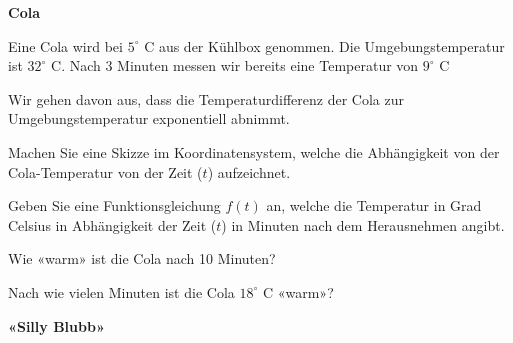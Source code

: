 

\bbwActAufgabenNr{} \textbf{Cola}

Eine Cola wird bei $5^\circ \textrm{ C}$ aus der Kühlbox genommen. Die
Umgebungstemperatur ist $32^\circ \textrm{ C}$. Nach 3 Minuten messen
wir bereits eine Temperatur von $9^\circ \textrm{ C}$ 

Wir gehen davon aus, dass die Temperaturdifferenz der Cola zur
Umgebungstemperatur exponentiell abnimmt.

\begin{bbwAufgabenBlock}
\item Machen Sie eine Skizze im Koordinatensystem, welche die
Abhängigkeit von der Cola-Temperatur von der Zeit ($t$) aufzeichnet.


\item Geben Sie eine Funktionsgleichung $f(t)$ an, welche die
  Temperatur in Grad Celsius in Abhängigkeit der Zeit ($t$) in Minuten
  nach dem Herausnehmen angibt.


\item Wie «warm» ist die Cola nach 10 Minuten?


\item Nach wie vielen Minuten ist die Cola $18^\circ \textrm{ C}$
«warm»?


\end{bbwAufgabenBlock}


\platzFuerBerechnungenBisEndeSeite{}




\bbwActAufgabenNr{} \textbf{«Silly Blubb»}

